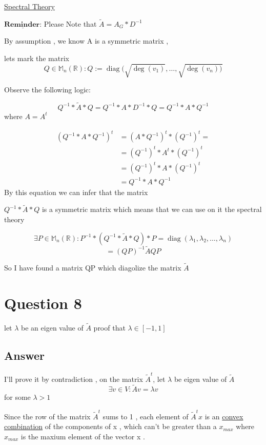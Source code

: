 \documentclass[9pt,twocolumn]{article}
\DeclareMathOperator{\diag}{diag}
\begin{document}
\href{https://en.wikipedia.org/wiki/Spectral\_theory}{Spectral Theory}

\begin{math}
\underline{\textbf{Reminder:}}
\end{math}
Please Note that \(\tilde{A}=A_G*D^{-1}\)

By assumption , we know A is a symmetric matrix ,

lets mark the matrix
\[ Q\in \mathbb{M}_n(\mathbb{R}) : Q := \diag(\sqrt{ \deg(v_1) },\dots , \sqrt{ \deg(v_n)) } \]

Observe the following logic:

\[
Q^{-1}*\tilde{A}*Q=Q^{-1}*A*D^{-1}*Q=Q^{-1}*A*Q^{-1}
\]
where \(A=A^{t}\)

\begin{align*}
(Q^{-1}*A*Q^{-1})^{t}&=(A*Q^{-1})^t*(Q^{-1})^t= \\
                    &=(Q^{-1})^t*A^t*(Q^{-1})^t \\
                    &=(Q^{-1})^t*A*(Q^{-1})^t \\
                    &=Q^{-1}*A*Q^{-1}
\end{align*}
By this equation we can infer that the matrix

\(Q^{-1}*\tilde{A}*Q\) is
a symmetric matrix which means that we can use on it the spectral theory

\[
\exists P\in \mathbb{M}_n(\mathbb{R}) : P^{-1}*(Q^{-1}*\tilde{A}*Q)*P = \diag(\lambda _1 , \lambda _2 , \dots , \lambda _n)
\]
\[
=(QP)^{-1}\tilde{A}QP
\]

So I have found a matrix QP which diagolize the matrix \(\tilde{A}\)





\section*{Question 8}
\label{sec:orgf0dd165}

let \(\lambda\) be an eigen value of \(\tilde{A}\) proof that
\(\lambda\in [-1,1]\)

\subsection*{Answer}
\label{sec:org70f53d1}
I'll prove it by contradiction , on the matrix \(\tilde{A}^t\), let \(\lambda\) be eigen value of \(\tilde{A}\)
\[\exists v\in V : \tilde{A}v=\lambda v\]
for some \(\lambda > 1\)

Since the row of the matrix \(\tilde{A}^t\) sums to 1 , each element of \(\tilde{A}^tx\) is an
\href{https://en.wikipedia.org/wiki/Convex\_combination}{convex combination} of the components of x , which can't be greater than a \(x_{max}\) where \(x_{max}\) is the maxium
element of the vector x .
\end{document}
